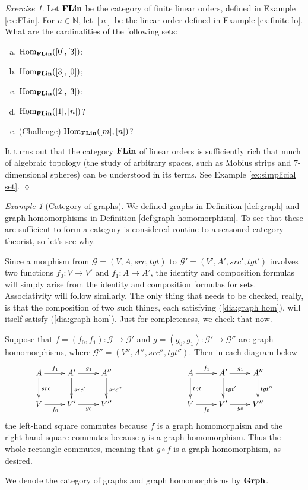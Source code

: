 \documentclass{book}
\def\tn{\textnormal}
\def\mc{\mathcal}
\def\NN{{\mathbb N}}
\def\Hom{\tn{Hom}}
\def\to{\rightarrow}
\def\taking{\colon}
\def\Grph{{\bf Grph}}
\def\FLin{{\bf FLin}}
\def\mcG{\mc{G}}
\theoremstyle{remark}
\newtheorem{example}[subsubsection]{Example}
\newtheorem{exc}[subsubsection]{Exercise}
\newenvironment{exercise}{\begin{exc}}{\hspace*{\fill}$\lozenge$\end{exc}}
\theoremstyle{definition}
\def\sexc{\begin{enumerate}[a.)]\setlength{\itemsep}{.1cm}\setlength{\parskip}{.1cm}\item}
\def\next{\item}
\def\endsexc{\end{enumerate}}
\begin{document}
\begin{exercise}
Let $\FLin$ be the category of finite linear orders, defined in Example \ref{ex:FLin}. For $n\in\NN$, let $[n]$ be the linear order defined in Example \ref{ex:finite lo}. What are the cardinalities of the following sets: 
\sexc $\Hom_{\FLin}([0],[3])$; 
\next $\Hom_\FLin([3],[0])$;
\next $\Hom_\FLin([2],[3])$;
\next $\Hom_\FLin([1],[n])$?
\next (Challenge) $\Hom_\FLin([m],[n])$?
\endsexc

It turns out that the category $\FLin$ of linear orders is sufficiently rich that much of algebraic topology (the study of arbitrary spaces, such as Mobius strips and $7$-dimensional spheres) can be understood in its terms. See Example \ref{ex:simplicial set}.
\end{exercise}

\begin{example}[Category of graphs]\index{a category!$\Grph$}

We defined graphs in Definition \ref{def:graph} and graph homomorphisms in Definition \ref{def:graph homomorphism}. To see that these are sufficient to form a category is considered routine to a seasoned category-theorist, so let's see why. 

Since a morphism from $\mcG=(V,A,src,tgt)$ to $\mcG'=(V',A',src',tgt')$ involves two functions $f_0\taking V\to V'$ and $f_1\taking A\to A'$, the identity and composition formulas will simply arise from the identity and composition formulas for sets. Associativity will follow similarly. The only thing that needs to be checked, really, is that the composition of two such things, each satisfying (\ref{dia:graph hom}), will itself satisfy (\ref{dia:graph hom}). Just for completeness, we check that now.

Suppose that $f=(f_0,f_1)\taking\mcG\to\mcG'$ and $g=(g_0,g_1)\taking\mcG'\to\mcG''$ are graph homomorphisms, where $\mcG''=(V'',A'',src'',tgt'')$. Then in each diagram below
\begin{align}\label{dia:graph hom comp}
\xymatrix{A\ar[r]^{f_1}\ar[d]^{src}&A'\ar[r]^{g_1}\ar[d]^{src'}&A''\ar[d]^{src''}\\V\ar[r]_{f_0}&V'\ar[r]_{g_0}&V''
}\hspace{1in}
\xymatrix{A\ar[r]^{f_1}\ar[d]^{tgt}&A'\ar[d]^{tgt'}\ar[r]^{g_1}&A''\ar[d]^{tgt''}\\V\ar[r]_{f_0}&V'\ar[r]_{g_0}&V''
}
\end{align}
the left-hand square commutes because $f$ is a graph homomorphism and the right-hand square commutes because $g$ is a graph homomorphism. Thus the whole rectangle commutes, meaning that $g\circ f$ is a graph homomorphism, as desired. 

We denote the category of graphs and graph homomorphisms by $\Grph$.

\end{example}
\end{document}
